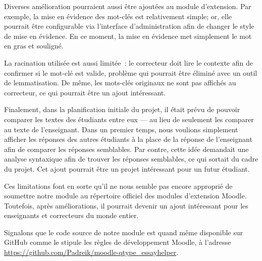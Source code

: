 Diverses am\'elioration pourraient aussi \^etre ajout\'ees au module d'extension.
Par exemple, la mise en \'evidence des mot-cl\'es est relativement simple; or, elle pourrait \^etre configurable via l'interface d'administration afin de changer le style de mise en \'evidence.
En ce moment, la mise en \'evidence met simplement le mot en gras et soulign\'e.

La racination utilis\'ee est aussi limit\'ee~: le correcteur doit lire le contexte afin de confirmer si le mot-cl\'e est valide, probl\`eme qui pourrait \^etre \'elimin\'e avec un outil de lemmatisation.
De m\^eme, les mots-cl\'es originaux ne sont pas affich\'es au correcteur, ce qui pourrait \^etre un ajout int\'eressant.

Finalement, dans la planification initiale du projet, il \'etait pr\'evu de pouvoir comparer les textes des \'etudiants entre eux --- au lieu de seulement les comparer au texte de l'enseignant.
Dans un premier temps, nous voulions simplement afficher les r\'eponses des autres \'etudiants \`a la place de la r\'eponse de l'enseignant afin de comparer les r\'eponses semblables.
Par contre, cette id\'ee demandait une analyse syntaxique afin de trouver les r\'eponses semblables, ce qui sortait du cadre du projet.
Cet ajout pourrait \^etre un projet int\'eressant pour un futur \'etudiant.

Ces limitations font en sorte qu'il ne nous semble pas encore appropri\'e de soumettre
notre module au r\'epertoire officiel des modules d'extension Moodle.
Toutefois, apr\`es am\'eliorations, il pourrait devenir un ajout int\'eressant pour les enseignants et correcteurs du monde entier.

Signalons que
le code source de notre module est quand m\^eme disponible sur GitHub comme le stipule les r\`egles de d\'eveloppement Moodle, \`a l'adresse \url{https://github.com/Padreik/moodle-qtype_essayhelper}.
